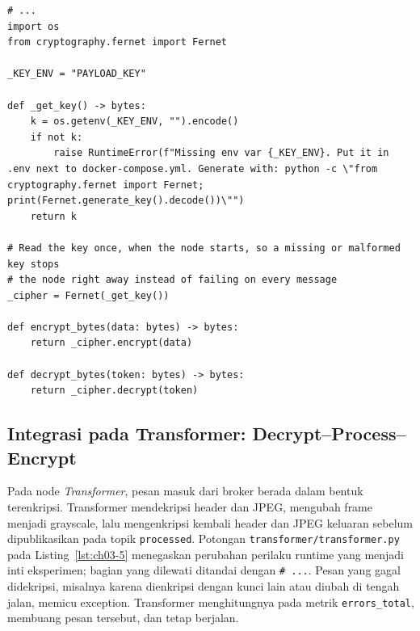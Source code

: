 \begin{lstlisting}[style=PythonStyle, caption={shared/crypto.py (excerpt): shared crypto helpers using PAYLOAD\_KEY}, label={lst:ch03-4}]
# ...
import os
from cryptography.fernet import Fernet

_KEY_ENV = "PAYLOAD_KEY"

def _get_key() -> bytes:
    k = os.getenv(_KEY_ENV, "").encode()
    if not k:
        raise RuntimeError(f"Missing env var {_KEY_ENV}. Put it in .env next to docker-compose.yml. Generate with: python -c \"from cryptography.fernet import Fernet; print(Fernet.generate_key().decode())\"")
    return k

# Read the key once, when the node starts, so a missing or malformed key stops
# the node right away instead of failing on every message
_cipher = Fernet(_get_key())

def encrypt_bytes(data: bytes) -> bytes:
    return _cipher.encrypt(data)

def decrypt_bytes(token: bytes) -> bytes:
    return _cipher.decrypt(token)
\end{lstlisting}

\subsection*{Integrasi pada Transformer: Decrypt--Process--Encrypt}

Pada node \emph{Transformer}, pesan masuk dari broker berada dalam bentuk terenkripsi. Transformer mendekripsi header dan JPEG, mengubah frame menjadi grayscale, lalu mengenkripsi kembali header dan JPEG keluaran sebelum dipublikasikan pada topik \texttt{processed}. Potongan \texttt{transformer/transformer.py} pada Listing~\ref{lst:ch03-5} menegaskan perubahan perilaku runtime yang menjadi inti eksperimen; bagian yang dilewati ditandai dengan \texttt{\# ...}. Pesan yang gagal didekripsi, misalnya karena dienkripsi dengan kunci lain atau diubah di tengah jalan, memicu exception. Transformer menghitungnya pada metrik \texttt{errors\_total}, membuang pesan tersebut, dan tetap berjalan.

